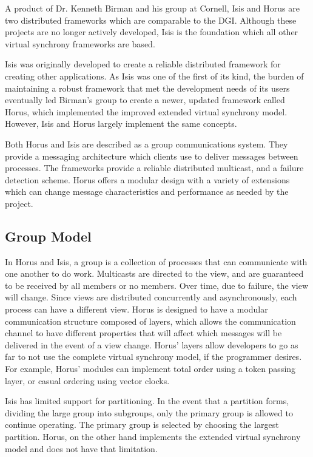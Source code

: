 A product of Dr. Kenneth Birman and his group at Cornell, Isis \cite{ISISTOOLKIT} and Horus \cite{HORUSTOOLKIT} are two distributed frameworks which are comparable to the DGI. Although these projects are no longer actively developed, Isis is the foundation which all other virtual synchrony frameworks are based.

Isis was originally developed to create a reliable distributed framework for creating other applications. As Isis was one of the first of its kind, the burden of maintaining a robust framework that met the development needs of its users eventually led Birman's group to create a newer, updated framework called Horus, which implemented the improved extended virtual synchrony model. However, Isis and Horus largely implement the same concepts.

Both Horus and Isis are described as a group communications system. They provide a messaging architecture which clients use to deliver messages between processes. The frameworks provide a reliable distributed multicast, and a failure detection scheme. Horus offers a modular design with a variety of extensions which can change message characteristics and performance as needed by the project.

\subsection{Group Model}
In Horus and Isis, a group is a collection of processes that can communicate with one another to do work. Multicasts are directed to the view, and are guaranteed to be received by all members or no members.
Over time, due to failure, the view will change. Since views are distributed concurrently and asynchronously, each process can have a different view. Horus is designed to have a modular communication structure composed of layers, which allows the communication channel to have different properties that will affect which messages will be delivered in the event of a view change. Horus' layers allow developers to go as far to not use the complete virtual synchrony model, if the programmer desires. For example, Horus' modules can implement total order using a token passing layer, or casual ordering using vector clocks.

Isis has limited support for partitioning. In the event that a partition forms, dividing the large group into subgroups, only the primary group is allowed to continue operating. The primary group is selected by choosing the largest partition. Horus, on the other hand implements the extended virtual synchrony model and does not have that limitation.

